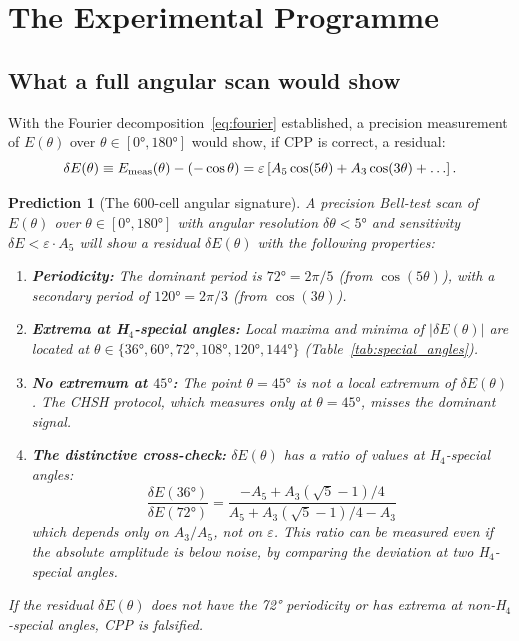 \documentclass[11pt,letterpaper]{article}
\newtheorem{prediction}[theorem]{Prediction}
\newcommand{\eps}{\varepsilon}
\begin{document}
\section{The Experimental Programme}
\label{sec:experiment}

\subsection{What a full angular scan would show}

With the Fourier decomposition~\eqref{eq:fourier} established, a
precision measurement of $E(\theta)$ over $\theta \in [0°, 180°]$
would show, if CPP is correct, a residual:
\begin{equation}
\delta E(\theta) \equiv E_{\rm meas}(\theta) - (-\cos\theta)
= \eps\left[A_5\cos(5\theta) + A_3\cos(3\theta) + \ldots\right].
\label{eq:residual}
\end{equation}

\begin{prediction}[The 600-cell angular signature]
\label{pred:angular}
A precision Bell-test scan of $E(\theta)$ over $\theta \in [0°, 180°]$
with angular resolution $\delta\theta < 5°$ and sensitivity
$\delta E < \eps \cdot A_5$ will show a residual $\delta E(\theta)$
with the following properties:
\begin{enumerate}
\item \textbf{Periodicity:} The dominant period is $72° = 2\pi/5$
  (from $\cos(5\theta)$), with a secondary period of $120° = 2\pi/3$
  (from $\cos(3\theta)$).
\item \textbf{Extrema at H$_4$-special angles:} Local maxima and
  minima of $|\delta E(\theta)|$ are located at
  $\theta \in \{36°, 60°, 72°, 108°, 120°, 144°\}$
  (Table~\ref{tab:special_angles}).
\item \textbf{No extremum at $45°$:} The point $\theta = 45°$ is not
  a local extremum of $\delta E(\theta)$.  The CHSH protocol, which
  measures only at $\theta = 45°$, misses the dominant signal.
\item \textbf{The distinctive cross-check:} $\delta E(\theta)$ has a
  ratio of values at H$_4$-special angles:
  \begin{equation}
  \frac{\delta E(36°)}{\delta E(72°)}
  = \frac{-A_5 + A_3(\sqrt5-1)/4}
         {A_5 + A_3(\sqrt5-1)/4 - A_3}
  \label{eq:ratio_check}
  \end{equation}
  which depends only on $A_3/A_5$, not on $\eps$.  This ratio can
  be measured even if the absolute amplitude is below noise, by
  comparing the deviation at two H$_4$-special angles.
\end{enumerate}
If the residual $\delta E(\theta)$ does \emph{not} have the 72°
periodicity or has extrema at non-H$_4$-special angles, CPP is
falsified.
\end{prediction}
\end{document}
